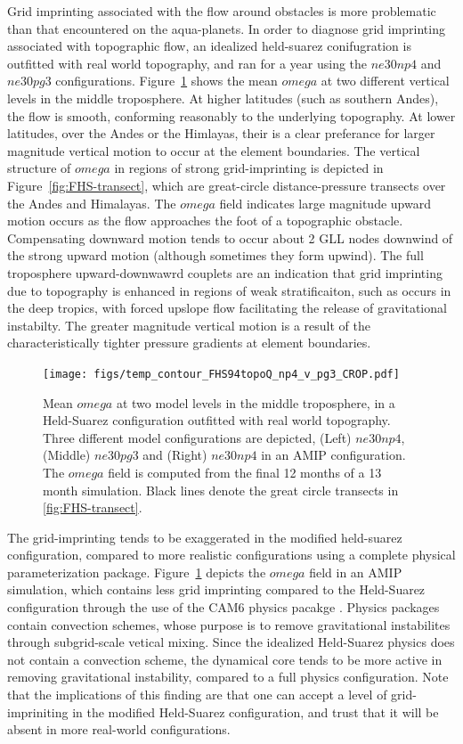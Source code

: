 \documentclass[twocol]{ametsoc}
\begin{document}
Grid imprinting associated with the flow around obstacles is more problematic than that encountered on the aqua-planets. In order to diagnose grid imprinting associated with topographic flow, an idealized held-suarez conifugration \citep{HS1994} is outfitted with real world topography, and ran for a year using the $ne30np4$ and $ne30pg3$ configurations. Figure~\ref{fig:FHS-contours} shows the mean $omega$ at two different vertical levels in the middle troposphere. At higher latitudes (such as southern Andes), the flow is smooth, conforming reasonably to the underlying topography. At lower latitudes, over the Andes or the Himlayas, their is a clear preferance for larger magnitude vertical motion to occur at the element boundaries. The vertical structure of $omega$ in regions of strong grid-imprinting is depicted in Figure~\ref{fig:FHS-transect}, which are great-circle distance-pressure transects over the Andes and Himalayas. The $omega$ field indicates large magnitude upward motion occurs as the flow approaches the foot of a topographic obstacle. Compensating downward motion tends to occur about 2 GLL nodes downwind of the strong upward motion (although sometimes they form upwind). The full troposphere upward-downwawrd couplets are an indication that grid imprinting due to topography is enhanced in regions of weak stratificaiton, such as occurs in the deep tropics, with forced upslope flow facilitating the release of gravitational instabilty. The greater magnitude vertical motion is a result of the characteristically tighter pressure gradients at element boundaries. 

\begin{figure}[t]
\noindent\texttt{[image: figs/temp\_contour\_FHS94topoQ\_np4\_v\_pg3\_CROP.pdf]}\\
\caption{Mean $omega$ at two model levels in the middle troposphere, in a Held-Suarez configuration outfitted with real world topography. Three different model configurations are depicted, (Left) $ne30np4$, (Middle) $ne30pg3$ and (Right) $ne30np4$ in an AMIP configuration. The $omega$ field is computed from the final 12 months of a 13 month simulation. Black lines denote the great circle transects in \ref{fig:FHS-transect}.}
\label{fig:FHS-contours}
\end{figure}


The grid-imprinting tends to be exaggerated in the modified held-suarez configuration, compared to more realistic configurations using a complete physical parameterization package. Figure~\ref{fig:FHS-contours} depicts the $omega$ field in an AMIP simulation, which contains less grid imprinting compared to the Held-Suarez configuration through the use of the CAM6 physics pacakge \citep{}. Physics packages contain convection schemes, whose purpose is to remove gravitational instabilites through subgrid-scale vetical mixing. Since the idealized Held-Suarez physics does not contain a convection scheme, the dynamical core tends to be more active in removing gravitational instability, compared to a full physics configuration. Note that the implications of this finding are that one can accept a level of grid-impriniting in the modified Held-Suarez configuration, and trust that it will be absent in more real-world configurations.
\end{document}
